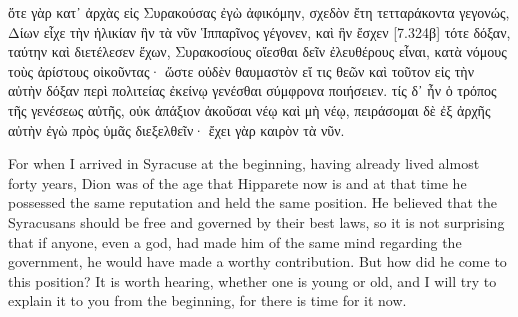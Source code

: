 \documentclass[12pt]{book}
\begin{document}
\begin{pairs}
\begin{Rightside}
\begin{Ancient Greek}
\beginnumbering
\pstart
ὅτε γὰρ κατ᾽ ἀρχὰς εἰς Συρακούσας ἐγὼ ἀφικόμην, σχεδὸν ἔτη τετταράκοντα γεγονώς, Δίων εἶχε τὴν ἡλικίαν ἣν τὰ νῦν Ἱππαρῖνος γέγονεν, καὶ ἣν ἔσχεν [7.324β] τότε δόξαν, ταύτην καὶ διετέλεσεν ἔχων, Συρακοσίους οἴεσθαι δεῖν ἐλευθέρους εἶναι, κατὰ νόμους τοὺς ἀρίστους οἰκοῦντας· ὥστε οὐδὲν θαυμαστὸν εἴ τις θεῶν καὶ τοῦτον εἰς τὴν αὐτὴν δόξαν περὶ πολιτείας ἐκείνῳ γενέσθαι σύμφρονα ποιήσειεν. τίς δ᾽ ἦν ὁ τρόπος τῆς γενέσεως αὐτῆς, οὐκ ἀπάξιον ἀκοῦσαι νέῳ καὶ μὴ νέῳ, πειράσομαι δὲ ἐξ ἀρχῆς αὐτὴν ἐγὼ πρὸς ὑμᾶς διεξελθεῖν· ἔχει γὰρ καιρὸν τὰ νῦν.	
\pend
\endnumbering
\end{Ancient Greek}
\end{Rightside}
\begin{Leftside}
\begin{English}
\beginnumbering
\pstart
For when I arrived in Syracuse at the beginning, having already lived almost forty years, Dion was of the age that Hipparete now is and at that time he possessed the same reputation and held the same position. He believed that the Syracusans should be free and governed by their best laws, so it is not surprising that if anyone, even a god, had made him of the same mind regarding the government, he would have made a worthy contribution. But how did he come to this position? It is worth hearing, whether one is young or old, and I will try to explain it to you from the beginning, for there is time for it now.
\pend
\endnumbering
\end{English}
\end{Leftside}
\end{pairs}
\Columns
\end{document}

